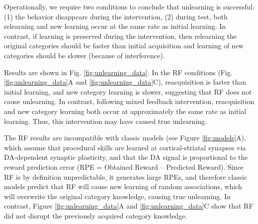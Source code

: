 \documentclass[apacite,draftfirst,man]{apa6}
\begin{document}
Operationally, we require two conditions to conclude that unlearning is
successful: (1) the behavior disappears during the intervention, (2) during
test, both relearning and new learning occur at the same rate as initial
learning. In contrast, if learning is preserved during the intervention, then
relearning the original categories should be faster than initial acquisition and
learning of new categories should be slower (because of interference).

Results are shown in Fig. \ref{fig:unlearning_data}. In the RF conditions (Fig.
\ref{fig:unlearning_data}A and \ref{fig:unlearning_data}C), reacquisition is
faster than initial learning, and new category learning is slower, suggesting
that RF does not cause unlearning. In contrast, following mixed feedback
intervention, reacquisition and new category learning both occur at
approximately the same rate as initial learning. Thus, this intervention may
have caused true unlearning.

The RF results are incompatible with classic models (see Figure
\ref{fig:models}A), which assume that procedural skills are learned at
cortical-striatal synapses via DA-dependent synaptic plasticity, and that the DA
signal is proportional to the reward prediction error (RPE = Obtained Reward --
Predicted Reward). Since RF is by definition unpredictable, it generates large
RPEs, and therefore classic models predict that RF will cause new learning of
random associations, which will overwrite the original category knowledge,
causing true unlearning. In contrast, Figure \ref{fig:unlearning_data}A and
\ref{fig:unlearning_data}C show that RF did not disrupt the previously acquired
category knowledge.
\end{document}
